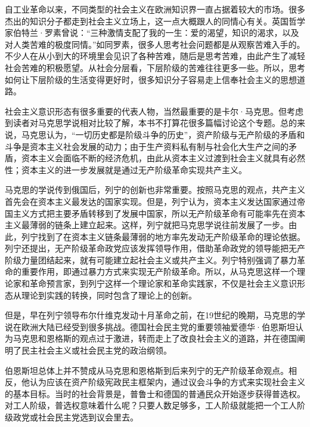 自工业革命以来，不同类型的社会主义在欧洲知识界一直占据着较大的市场。很多杰出的知识分子都走到社会主义立场上，这一点大概跟人的同情心有关。英国哲学家伯特兰·罗素曾说：“三种激情支配了我的一生：爱的渴望，知识的渴求，以及对人类苦难的极度同情。”如同罗素，很多人思考社会问题都是从观察苦难入手的。不少人在从小到大的环境里会见识了各种苦难，随后是思考苦难，由此产生了减轻社会苦难的积极愿望。从社会分层看，下层阶级的苦难往往更多一些。所以，思考如何让下层阶级的生活变得更好时，很多知识分子容易走上信奉社会主义的思想道路。


社会主义意识形态有很多重要的代表人物，当然最重要的是卡尔·马克思。但考虑到读者对马克思学说相对比较了解，本书不打算花很多篇幅讨论这个专题。总的来说，马克思认为，“一切历史都是阶级斗争的历史”，资产阶级与无产阶级的矛盾和斗争是资本主义社会发展的动力；由于生产资料私有制与社会化大生产之间的矛盾，资本主义会面临不断的经济危机，由此从资本主义过渡到社会主义就具有必然性；资本主义的进一步发展就是通过无产阶级革命实现共产主义。

马克思的学说传到俄国后，列宁的创新也非常重要。按照马克思的观点，共产主义首先会在资本主义最发达的国家实现。但是，列宁认为，资本主义发达国家通过帝国主义方式把主要矛盾转移到了发展中国家，所以无产阶级革命有可能率先在资本主义最薄弱的链条上建立起来。这样，列宁就把马克思学说往前发展了一步。由此，列宁找到了在资本主义链条最薄弱的地方率先发动无产阶级革命的理论依据。列宁还提出，无产阶级革命政党应该发挥领导作用，借助革命政党的领导能把无产阶级力量团结起来，就有可能建立起社会主义或共产主义。列宁特别强调了暴力革命的重要作用，即通过暴力方式来实现无产阶级革命。所以，从马克思这样一个理论家和革命预言家，到列宁这样一个理论家和革命实践家，不仅是社会主义意识形态从理论到实践的转换，同时包含了理论上的创新。

但是，早在列宁领导布尔什维克发动十月革命之前，在19世纪的晚期，马克思的学说在欧洲大陆已经受到很多挑战。德国社会民主党的重要领袖爱德华·伯恩斯坦认为马克思和恩格斯的观点过于激进，转而走上了改良社会主义的道路，并在德国阐明了民主社会主义或社会民主党的政治纲领。

伯恩斯坦总体上并不赞成从马克思和恩格斯到后来列宁的无产阶级革命观点。相反，他认为应该在资产阶级宪政民主框架内，通过议会斗争的方式来实现社会主义的基本目标。当时的社会背景是，普鲁士和德国的普通民众开始逐步获得普选权。对工人阶级，普选权意味着什么呢？只要人数足够多，工人阶级就能把一个工人阶级政党或社会民主党选到议会里去。

